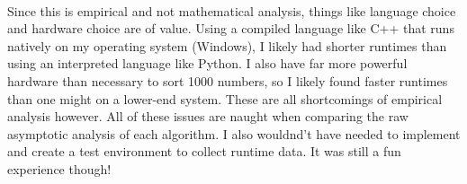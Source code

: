 \documentclass[12pt]{article}
\begin{document}
\paragraph{}
Since this is empirical and not mathematical analysis, things like language choice and hardware choice are of value.  Using a compiled language like C++ that runs natively on my operating system (Windows), I likely had shorter runtimes than using an interpreted language like Python.  I also have far more powerful hardware than necessary to sort 1000 numbers, so I likely found faster runtimes than one might on a lower-end system.  These are all shortcomings of empirical analysis however.  All of these issues are naught when comparing the raw asymptotic analysis of each algorithm.  I also wouldnd't have needed to implement and create a test environment to collect runtime data.  It was still a fun experience though!
\end{document}
